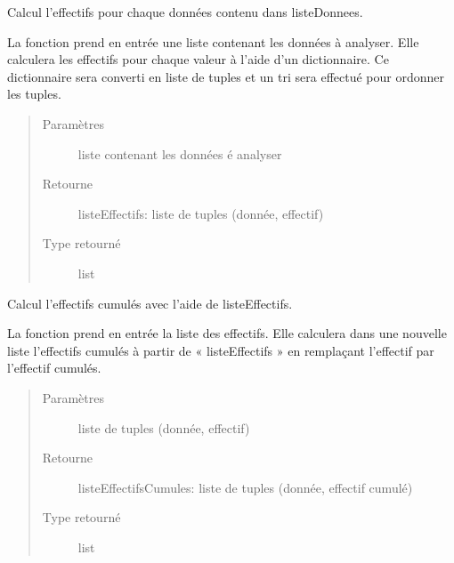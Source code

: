 \documentclass[letterpaper,10pt,openany,oneside,french]{sphinxmanual}
\begin{document}
\begin{fulllineitems}
\label{\detokenize{addQualitatives:add.addQualitatives.calculEffectifs}}
Calcul l’effectifs pour chaque données contenu dans listeDonnees.

La fonction prend en entrée une liste contenant les données à analyser. Elle calculera les effectifs pour chaque valeur à 
l’aide d’un dictionnaire. Ce dictionnaire sera converti en liste de tuples et un tri sera effectué pour ordonner les
tuples.
\begin{quote}\begin{description}
\item[{Paramètres}] \leavevmode
{} \textendash{} liste contenant les données é analyser

\item[{Retourne}] \leavevmode
listeEffectifs: liste de tuples (donnée, effectif)

\item[{Type retourné}] \leavevmode
list

\end{description}\end{quote}

\end{fulllineitems}


\begin{fulllineitems}
\label{\detokenize{addQualitatives:add.addQualitatives.calculEffectifsCumules}}
Calcul l’effectifs cumulés avec l’aide de listeEffectifs.

La fonction prend en entrée la liste des effectifs. Elle calculera dans une nouvelle liste l’effectifs cumulés à partir 
de « listeEffectifs » en remplaçant l’effectif par l’effectif cumulés.
\begin{quote}\begin{description}
\item[{Paramètres}] \leavevmode
{} \textendash{} liste de tuples (donnée, effectif)

\item[{Retourne}] \leavevmode
listeEffectifsCumules: liste de tuples (donnée, effectif cumulé)

\item[{Type retourné}] \leavevmode
list

\end{description}\end{quote}

\end{fulllineitems}
\end{document}
